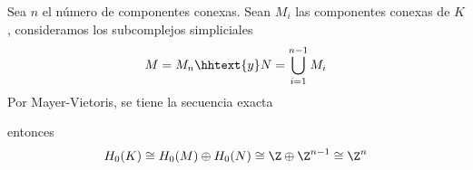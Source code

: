 \documentclass{article}
\begin{document}
\begin{enumerate}
    \vspace{1mm}
    Sea $n$ el número de componentes conexas. Sean $M_{i}$ las componentes conexas de $K$, 
    consideramos los subcomplejos simpliciales
    \begin{equation*}
        M=M_{n} \hhtext{y} N=\bigcup_{i=1}^{n-1}M_{i}
    \end{equation*}
    Por Mayer-Vietoris, se tiene la secuencia exacta
    
    \vspace{2mm}
    \centerline{
    }
    entonces
    \begin{equation*}
        H_{0}(K)\cong H_{0}(M)\oplus H_{0}(N)\cong\Z\oplus\Z^{n-1}\cong\Z^{n}
    \end{equation*}
\end{enumerate}

\end{document}
